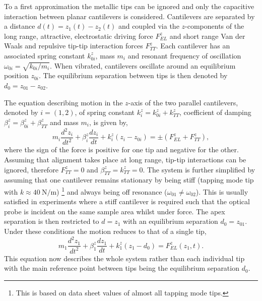 \documentclass{article}
\begin{document}
To a first approximation the metallic tips can be ignored and only the capacitive interaction between planar cantilevers is considered. Cantilevers are separated by a distance $d(t) = z_1(t) - z_2(t)$ and coupled via the $z$-components of the long range, attractive, electrostatic driving force $F_{EL}^z$ and short range  Van der Waals and repulsive tip-tip interaction forces $F_{TT}^z$. Each cantilever has an associated spring constant $k_{0i}^z$, mass $m_i$ and resonant frequency of oscillation $\omega_{0i} = \sqrt{k_{0i}/m_i}$. When vibrated, cantilevers oscillate around an equilibrium position $z_{0i}$. The equilibrium separation between tips is then denoted by $d_0 = z_{01} - z_{02}$.

The equation describing motion in the $z$-axis of the two parallel cantilevers, denoted by $i=(1,2)$, of spring constant $k_i^z=k_{0i}^z+k_{TT}^z$, coefficient of damping $\beta_i^z=\beta_{0i}^z+\beta_{TT}^z$ and mass $m_i$, is given by,
\begin{equation}
	m_i\frac{d^2z_i}{dt^2}+\beta_i^z\frac{dz_i}{dt}+k_i^z\left(z_i-z_{0i}\right)=\pm\left(F_{EL}^z+F_{TT}^z\right),
\end{equation}
where the sign of the force is positive for one tip and negative for the other.
Assuming that alignment takes place at long range, tip-tip interactions can be ignored, therefore $F_{TT}^z = 0$ and $\beta_{TT}^{z} = k_{TT}^{z} = 0$. The system is further simplified by assuming that one cantilever remains stationary by being stiff (tapping mode tip with $k\approx\SI{40}{\newton\per\metre}$)%
\footnote{This is based on data sheet values of almost all tapping mode tips.}
and always being off resonance ($\omega_{01} \neq \omega_{02}$). This is usually satisfied in experiments where a stiff cantilever is required such that the optical probe is incident on the same sample area whilst under force. The apex separation is then restricted to $d=z_1$ with an equilibrium separation $d_0 = z_{01}$. Under these conditions the motion reduces to that of a single tip,
\begin{equation}
	m_1\frac{d^2z_1}{dt^2}+\beta_1^z\frac{dz_1}{dt}+k_1^z\left(z_1-d_0\right) = F_{EL}^z(z_1, t).
	\label{eq:simple_eom}
\end{equation}
This equation now describes the whole system rather than each individual tip with the main reference point between tips being the equilibrium separation $d_0$.
\end{document}
